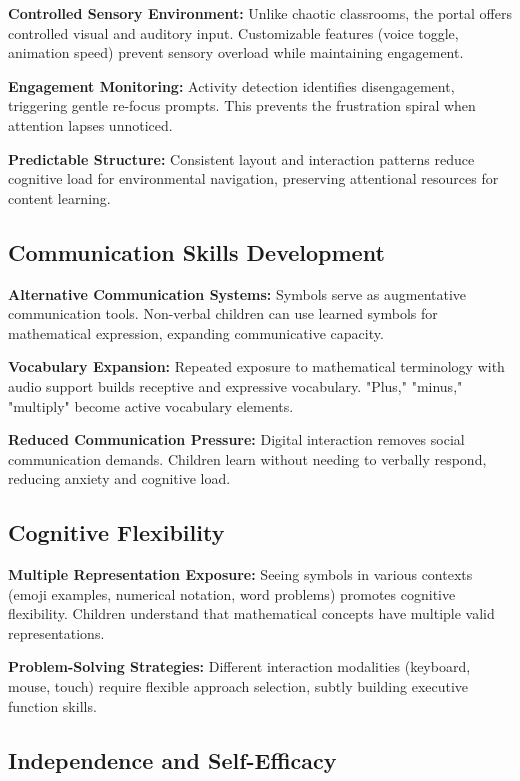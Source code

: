 \documentclass[11pt, a4paper]{article}
\begin{document}
\textbf{Controlled Sensory Environment:} Unlike chaotic classrooms, the portal offers controlled visual and auditory input. Customizable features (voice toggle, animation speed) prevent sensory overload while maintaining engagement.

\textbf{Engagement Monitoring:} Activity detection identifies disengagement, triggering gentle re-focus prompts. This prevents the frustration spiral when attention lapses unnoticed.

\textbf{Predictable Structure:} Consistent layout and interaction patterns reduce cognitive load for environmental navigation, preserving attentional resources for content learning.

\subsection{Communication Skills Development}

\textbf{Alternative Communication Systems:} Symbols serve as augmentative communication tools. Non-verbal children can use learned symbols for mathematical expression, expanding communicative capacity.

\textbf{Vocabulary Expansion:} Repeated exposure to mathematical terminology with audio support builds receptive and expressive vocabulary. "Plus," "minus," "multiply" become active vocabulary elements.

\textbf{Reduced Communication Pressure:} Digital interaction removes social communication demands. Children learn without needing to verbally respond, reducing anxiety and cognitive load.

\subsection{Cognitive Flexibility}

\textbf{Multiple Representation Exposure:} Seeing symbols in various contexts (emoji examples, numerical notation, word problems) promotes cognitive flexibility. Children understand that mathematical concepts have multiple valid representations.

\textbf{Problem-Solving Strategies:} Different interaction modalities (keyboard, mouse, touch) require flexible approach selection, subtly building executive function skills.

\subsection{Independence and Self-Efficacy}
\end{document}
